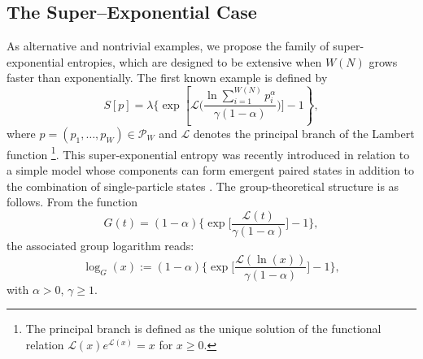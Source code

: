 \documentclass[10pt]{amsart}
\newcommand{\beq}{\begin{equation}}
\newcommand{\eeq}{\end{equation}}
\theoremstyle{definition}
\theoremstyle{definition}	 %
\begin{document}
\subsection{The Super--Exponential Case} As alternative and nontrivial examples, we propose the family of super-exponential entropies, which are designed to be extensive when $W(N)$ grows faster than exponentially. The first known example is defined by
	\begin{equation}
	S[p]=\lambda\Bigg\{\exp\left[\mathcal{L}\Big(\frac{\ln \sum_{i=1}^{W(N)}p_i^\alpha}{\gamma(1-\alpha)}\Big)\Bigg]-1\right\}, \label{superexpEnt}
	\end{equation}
where $p=(p_1,\ldots,p_W)\in \mathcal{P}_W$ and $\mathcal{L}$ denotes the principal branch of the Lambert function \footnote{The principal branch is defined as the unique solution of the functional relation $\mathcal{L}(x)e^{\mathcal{L}(x)}=x$ for $x\geq 0$.}. This super-exponential entropy  was recently introduced in relation to a simple model whose components can form emergent paired states in addition to the combination of single-particle states \cite{JPPT2018JPA}. The group-theoretical structure is as follows. From the function
\beq
G(t)=(1-\alpha)\Bigg\{\exp\Big[\frac{\mathcal{L}(t)}{\gamma(1-\alpha)}\Big]-1\Bigg\},
\eeq
the associated group logarithm reads:
\beq
\log_G(x):=(1-\alpha)\Bigg\{\exp\Big[\frac{\mathcal{L}(\ln (x))}{\gamma(1-\alpha)}\Big]-1\Bigg\},
\eeq
with $\alpha>0$, $\gamma\geq 1$.

\newpage

\end{document}
